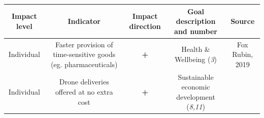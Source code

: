 \documentclass[
]{book}
\begin{document}
\begin{longtable}[]{@{}ccccc@{}}
\toprule
\begin{minipage}[b]{0.17\columnwidth}\centering
Impact level\strut
\end{minipage} & \begin{minipage}[b]{0.16\columnwidth}\centering
Indicator\strut
\end{minipage} & \begin{minipage}[b]{0.17\columnwidth}\centering
Impact direction\strut
\end{minipage} & \begin{minipage}[b]{0.17\columnwidth}\centering
Goal description and number\strut
\end{minipage} & \begin{minipage}[b]{0.17\columnwidth}\centering
Source\strut
\end{minipage}\tabularnewline
\midrule
\endhead
\begin{minipage}[t]{0.17\columnwidth}\centering
Individual\strut
\end{minipage} & \begin{minipage}[t]{0.16\columnwidth}\centering
Faster provision of time-sensitive goods (eg. pharmaceuticals)\strut
\end{minipage} & \begin{minipage}[t]{0.17\columnwidth}\centering
\textbf{+}\strut
\end{minipage} & \begin{minipage}[t]{0.17\columnwidth}\centering
Health \& Wellbeing (\emph{3})\strut
\end{minipage} & \begin{minipage}[t]{0.17\columnwidth}\centering
Fox Rubin, 2019\strut
\end{minipage}\tabularnewline
\begin{minipage}[t]{0.17\columnwidth}\centering
Individual\strut
\end{minipage} & \begin{minipage}[t]{0.16\columnwidth}\centering
Drone deliveries offered at no extra cost\strut
\end{minipage} & \begin{minipage}[t]{0.17\columnwidth}\centering
\textbf{+}\strut
\end{minipage} & \begin{minipage}[t]{0.17\columnwidth}\centering
Sustainable economic development (\emph{8,11})\strut
\end{minipage} & \begin{minipage}[t]{0.17\columnwidth}\centering

\end{minipage}
\end{longtable}
\end{document}
